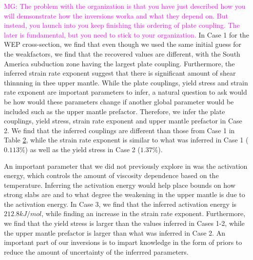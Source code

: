 \documentclass[12pt]{article}
\newcommand{\mgnote}[1]{\textcolor{magenta}{MG: #1}}
\begin{document}
\begin{table}
\begin{table}[H]
\begin{tabular}{c c c c c c c c  }
          
                \hline %
		\end{tabular}
		\label{table:inversions} %
		\end{table}
\end{table}



\mgnote{The problem with the organization is that you have just described how you will demsonstrate how the inversions worka and what they depend on. But instead, you launch into you keep finishing this ordering of plate coupling. The later is fundamental, but you need to stick to your organization.} 
In Case 1 for the WEP cross-section, we find that even though we used the same initial guess for the weakfactors, we find that the recovered values are different, with the South America subduction zone having the largest plate coupling. Furthermore, the inferred strain rate exponent suggest that there is significant amount of shear thinnning in thee upper mantle. While the plate couplings, yield stress and strain rate exponent are important parameters to infer, a natural question to ask would be how would these parameters change if another global parameter would be included such as the upper mantle prefactor. Therefore, we infer the plate couplings, yield stress, strain rate exponent and upper mantle prefactor in Case 2. We find that the inferred couplings are different than those from Case 1 in Table \ref{table:inversions}, while the strain rate exponent is similar to what was inferred in Case 1 ($0.113\%$) as well as the yield stress in Case 2 ($1.37\%$).  

An important parameter that we did not previously explore in \citep{ratnaswamy2015adjoint} was the activation energy, which controls the amount of viscosity dependence based on the temperature. Inferring the activation energy would help place bounds on how strong slabs are and to what degree the weakening in the upper mantle is due to the activation energy. In Case 3, we find that the inferred activation energy is 
$212.8 kJ/mol$, while finding an increase in the strain rate exponent. Furthermore, we find that the yield stress is larger than the values inferred in Cases 1-2, while the upper mantle prefactor is larger than  what was inferred in Case 2. An important part of our inversions is to impart knowledge in the form of priors to reduce the amount of uncertainty of the inferrred parameters.
\end{document}
